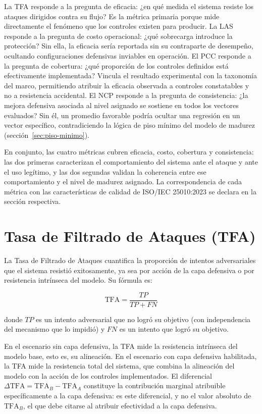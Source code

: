 La TFA responde a la pregunta de eficacia: ¿en qué medida el sistema resiste los ataques dirigidos contra su flujo? Es la métrica primaria porque mide directamente el fenómeno que los controles existen para producir. La LAS responde a la pregunta de costo operacional: ¿qué sobrecarga introduce la protección? Sin ella, la eficacia sería reportada sin su contraparte de desempeño, ocultando configuraciones defensivas inviables en operación. El PCC responde a la pregunta de cobertura: ¿qué proporción de los controles definidos está efectivamente implementada? Vincula el resultado experimental con la taxonomía del marco, permitiendo atribuir la eficacia observada a controles constatables y no a resistencia accidental. El NCP responde a la pregunta de consistencia: ¿la mejora defensiva asociada al nivel asignado se sostiene en todos los vectores evaluados? Sin él, un promedio favorable podría ocultar una regresión en un vector específico, contradiciendo la lógica de piso mínimo del modelo de madurez (sección~\ref{sec:piso-minimo}).

En conjunto, las cuatro métricas cubren eficacia, costo, cobertura y consistencia: las dos primeras caracterizan el comportamiento del sistema ante el ataque y ante el uso legítimo, y las dos segundas validan la coherencia entre ese comportamiento y el nivel de madurez asignado. La correspondencia de cada métrica con las características de calidad de ISO/IEC 25010:2023 se declara en la sección respectiva.

\section{Tasa de Filtrado de Ataques (TFA)}
\label{sec:tfa}

La Tasa de Filtrado de Ataques cuantifica la proporción de intentos adversariales que el sistema resistió exitosamente, ya sea por acción de la capa defensiva o por resistencia intrínseca del modelo. Su fórmula es:

\[
  \text{TFA} = \frac{TP}{TP + FN}
\]

donde $TP$ es un intento adversarial que no logró su objetivo (con
independencia del mecanismo que lo impidió) y $FN$ es un intento que
logró su objetivo.

En el escenario sin capa defensiva, la TFA mide la resistencia intrínseca
del modelo base, esto es, su alineación. En el escenario con capa defensiva
habilitada, la TFA mide la resistencia total del sistema, que combina la
alineación del modelo con la acción de los controles implementados. El
diferencial $\Delta\text{TFA} = \text{TFA}_B - \text{TFA}_A$ constituye la
contribución marginal atribuible específicamente a la capa defensiva: es
este diferencial, y no el valor absoluto de $\text{TFA}_B$, el que debe
citarse al atribuir efectividad a la capa defensiva.

